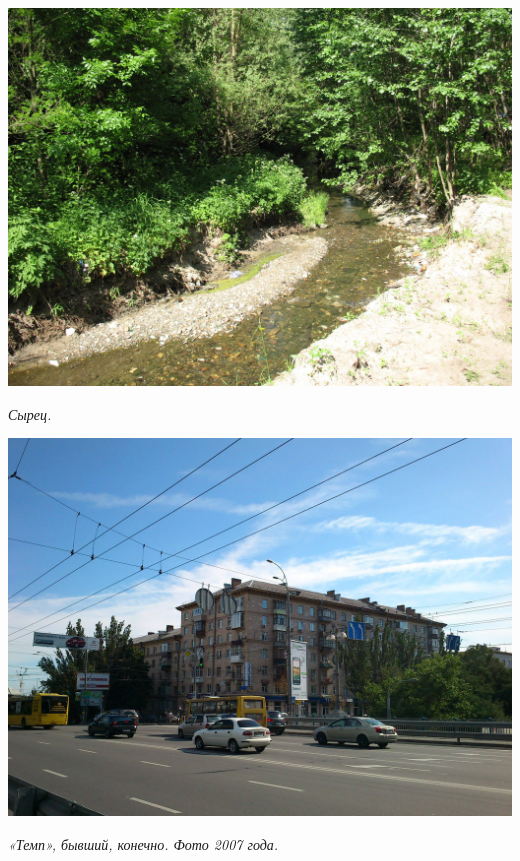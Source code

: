 \begin{center}
\includegraphics[width=\linewidth]{rpix/IMG_4319.jpg}

\textit{Сырец.}
\end{center}


\begin{center}
\includegraphics[width=\linewidth]{rpix/DSC_0016.JPG}

\textit{«Темп», бывший, конечно. Фото 2007 года.}
\end{center}




